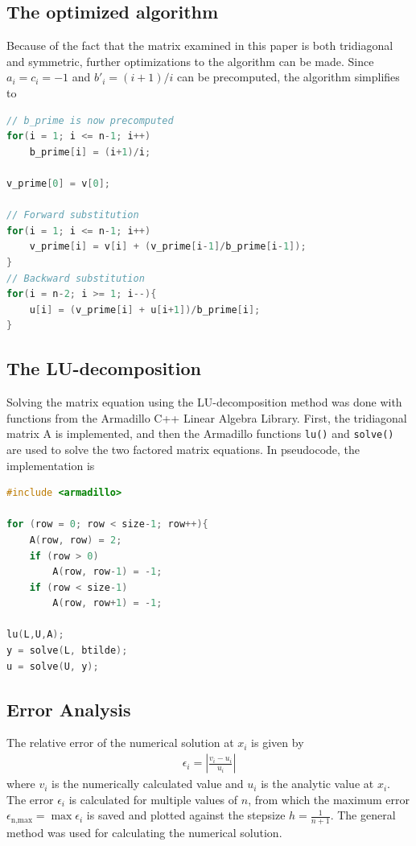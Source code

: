 \documentclass[aps,reprint]{revtex4-1}
\begin{document}
\subsection{The optimized algorithm}
Because of the fact that the matrix examined in this paper is both tridiagonal and
symmetric, further optimizations to the algorithm can be made. Since $a_i = c_i = -1$
and $b'_i = (i+1)/i$ can be precomputed, the algorithm simplifies to
\begin{lstlisting}[language=cpp, caption={Optimized version of Thomas algorithm for a symmetric tridiagonal matrix}]
// b_prime is now precomputed
for(i = 1; i <= n-1; i++)
    b_prime[i] = (i+1)/i;

v_prime[0] = v[0];

// Forward substitution
for(i = 1; i <= n-1; i++)
    v_prime[i] = v[i] + (v_prime[i-1]/b_prime[i-1]);
}
// Backward substitution
for(i = n-2; i >= 1; i--){
    u[i] = (v_prime[i] + u[i+1])/b_prime[i];
}
\end{lstlisting}
\subsection{The LU-decomposition}
Solving the matrix equation using the LU-decomposition method was done with
functions from the Armadillo C++ Linear Algebra Library. First, the tridiagonal
matrix A is implemented, and then the Armadillo functions \texttt{lu()} and \texttt{solve()}
are used to solve the two factored matrix equations. In pseudocode, the implementation is
\begin{lstlisting}[language=cpp, caption={Pseudocode of LU-decomposition method implementation}]
#include <armadillo>

for (row = 0; row < size-1; row++){
    A(row, row) = 2;
    if (row > 0)
        A(row, row-1) = -1;
    if (row < size-1)
        A(row, row+1) = -1;

lu(L,U,A);
y = solve(L, btilde);
u = solve(U, y);
\end{lstlisting}
\subsection{Error Analysis}
The relative error of the numerical solution at $x_i$ is given by
\begin{align*}
  \epsilon_i = \left| \frac{v_i - u_i}{u_i} \right|
\end{align*}
where $v_i$ is the numerically calculated value and $u_i$ is the analytic value
at \(x_{i}\).
The error $\epsilon_i$ is calculated for multiple values of \(n\), from which the
maximum error $\epsilon_\text{n,max} = \max{\epsilon_{i}}$ is saved and plotted
against the stepsize \(h = \frac{1}{n+1}\).
The general method was used for calculating the numerical solution.
\end{document}
